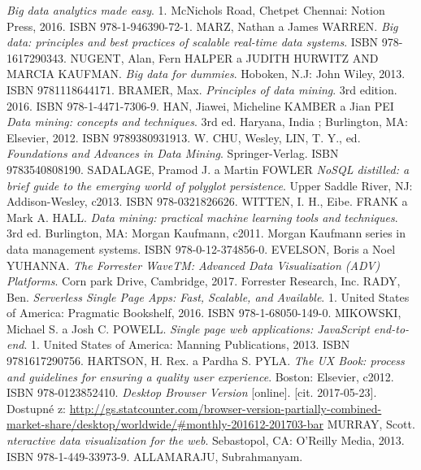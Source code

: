 \begin{thebibliography}{99}
\textit{Big data analytics made easy}.
1. McNichols Road, Chetpet Chennai: Notion Press, 2016. ISBN 978-1-946390-72-1.
MARZ, Nathan a James WARREN.
\textit{Big data: principles and best practices of scalable real-time data systems}.
ISBN 978-1617290343.
NUGENT, Alan, Fern HALPER a JUDITH HURWITZ AND MARCIA KAUFMAN.
\textit{Big data for dummies}.
Hoboken, N.J: John Wiley, 2013. ISBN 9781118644171.
BRAMER, Max.
\textit{Principles of data mining}.
3rd edition. 2016. ISBN 978-1-4471-7306-9.
HAN, Jiawei, Micheline KAMBER a Jian PEI
\textit{Data mining: concepts and techniques}.
3rd ed. Haryana, India ; Burlington, MA: Elsevier, 2012. ISBN 9789380931913.
W. CHU, Wesley, LIN, T. Y., ed.
\textit{Foundations and Advances in Data Mining}.
Springer-Verlag. ISBN 9783540808190.
SADALAGE, Pramod J. a Martin FOWLER
\textit{NoSQL distilled: a brief guide to the emerging world of polyglot persistence}.
Upper Saddle River, NJ: Addison-Wesley, c2013. ISBN 978-0321826626.
WITTEN, I. H., Eibe. FRANK a Mark A. HALL.
\textit{Data mining: practical machine learning tools and techniques}.
3rd ed. Burlington, MA: Morgan Kaufmann, c2011. Morgan Kaufmann series in data management systems. ISBN 978-0-12-374856-0.
EVELSON, Boris a Noel YUHANNA.
\textit{The Forrester WaveTM: Advanced Data Visualization (ADV) Platforms}.
Corn park Drive, Cambridge, 2017. Forrester Research, Inc.
RADY, Ben.
\textit{Serverless Single Page Apps: Fast, Scalable, and Available}.
1. United States of America: Pragmatic Bookshelf, 2016. ISBN 978-1-68050-149-0.
MIKOWSKI, Michael S. a Josh C. POWELL.
\textit{Single page web applications: JavaScript end-to-end}.
1. United States of America: Manning Publications, 2013. ISBN 9781617290756.
HARTSON, H. Rex. a Pardha S. PYLA.
\textit{The UX Book: process and guidelines for ensuring a quality user experience}.
Boston: Elsevier, c2012. ISBN 978-0123852410.
\textit{Desktop Browser Version}
[online]. [cit. 2017-05-23]. Dostupné z: \url{http://gs.statcounter.com/browser-version-partially-combined-market-share/desktop/worldwide/\#monthly-201612-201703-bar}
MURRAY, Scott.
\textit{nteractive data visualization for the web}.
Sebastopol, CA: O'Reilly Media, 2013. ISBN 978-1-449-33973-9.
ALLAMARAJU, Subrahmanyam.

\end{thebibliography}
